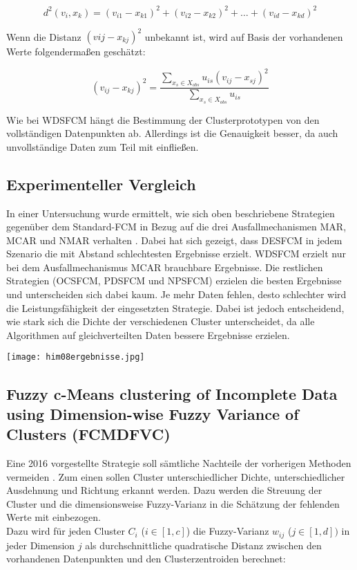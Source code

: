 \documentclass[11pt,ceqn]{book}
\begin{document}
$$d^2(v_i,x_k) = (v_{i1}-x_{k1})^2 + (v_{i2}-x_{k2})^2 + \dots + (v_{id}-x_{kd})^2$$

Wenn die Distanz $(v{ij}-x_{kj})^2$ unbekannt ist, wird auf Basis der vorhandenen Werte folgendermaßen geschätzt:

$$(v_{ij}-x_{kj})^2 = \frac{\sum\limits_{x_s \in X_{obs}} u_{is}(v_{ij}-x_{sj})^2}{\sum\limits_{x_s \in X_{obs}} u_{is}}$$

Wie bei WDSFCM hängt die Bestimmung der Clusterprototypen von den vollständigen Datenpunkten ab. Allerdings ist die Genauigkeit besser, da auch unvollständige Daten zum Teil mit einfließen.

\subsection{Experimenteller Vergleich}
In einer Untersuchung wurde ermittelt, wie sich oben beschriebene Strategien gegenüber dem Standard-FCM in Bezug auf die drei Ausfallmechanismen MAR, MCAR und NMAR verhalten \cite{mvresult}. Dabei hat sich gezeigt, dass DESFCM in jedem Szenario die mit Abstand schlechtesten Ergebnisse erzielt. WDSFCM erzielt nur bei dem Ausfallmechanismus MCAR brauchbare Ergebnisse. Die restlichen Strategien (OCSFCM, PDSFCM und NPSFCM) erzielen die besten Ergebnisse und unterscheiden sich dabei kaum. Je mehr Daten fehlen, desto schlechter wird die Leistungsfähigkeit der eingesetzten Strategie. Dabei ist jedoch entscheidend, wie stark sich die Dichte der verschiedenen Cluster unterscheidet, da alle Algorithmen auf gleichverteilten Daten bessere Ergebnisse erzielen.
\begin{minipage}{1\textwidth}
\texttt{[image: him08ergebnisse.jpg]}
\end{minipage}

\subsection{Fuzzy c-Means clustering of Incomplete Data using Dimension-wise Fuzzy Variance of Clusters (FCMDFVC)}

Eine 2016 vorgestellte Strategie soll sämtliche Nachteile der vorherigen Methoden vermeiden \cite{fcmdfvc}. Zum einen sollen Cluster unterschiedlicher Dichte, unterschiedlicher Ausdehnung und Richtung erkannt werden. Dazu werden die Streuung der Cluster und die dimensionsweise Fuzzy-Varianz in die Schätzung der fehlenden Werte mit einbezogen.\\

Dazu wird für jeden Cluster $C_i$ ($i\in \left[1,c \right]$) die Fuzzy-Varianz $w_{ij}$ ($j\in\left[1,d \right])$ in jeder Dimension $j$ als durchschnittliche quadratische Distanz zwischen den vorhandenen Datenpunkten und den Clusterzentroiden berechnet:
\end{document}
